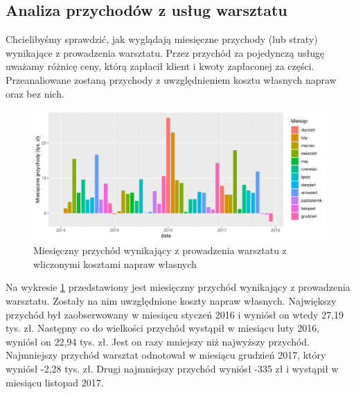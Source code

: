 \documentclass{article}\usepackage[]{graphicx}\usepackage[]{xcolor}
\makeatletter
\def\maxwidth{ %
  \ifdim\Gin@nat@width>\linewidth
    \linewidth
  \else
    \Gin@nat@width
  \fi
}
\newenvironment{knitrout}{}{} %
\makeatother
\begin{document}
\subsection{Analiza przychodów z usług warsztatu}

Chcielibyśmy sprawdzić, jak wyglądają miesięczne przychody (lub straty) wynikające z prowadzenia warsztatu. Przez przychód za pojedynczą usługę uważamy różnicę ceny, którą zapłacił klient i kwoty zapłaconej za części. Przeanaliowane zostaną przychody z uwzględnieniem kosztu własnych napraw oraz bez nich.

\begin{knitrout}
\color{fgcolor}\begin{figure}[H]

{\centering \includegraphics[width=\maxwidth]{figure/fig_uslugi-1} 

}

\caption[Miesięczny przychód wynikający z prowadzenia warsztatu z wliczonymi kosztami napraw własnych]{Miesięczny przychód wynikający z prowadzenia warsztatu z wliczonymi kosztami napraw własnych}\label{fig:fig_uslugi}
\end{figure}

\end{knitrout}

Na wykresie \ref{fig:fig_uslugi} przedstawiony jest miesięczny przychód wynikający z prowadzenia warsztatu. Zostały na nim uwzględnione koszty napraw własnych. 
Największy przychód był zaobserwowany w miesiącu styczeń 2016 i wyniósł on wtedy 27,19 tys. zł.
Następny co do wielkości przychód wystąpił w miesiącu luty 2016, wyniósł on 22,94 tys. zł. Jest on  razy mniejszy niż najwyższy przychód.
Najmniejszy przychód warsztat odnotował w miesiącu grudzień 2017, który wyniósł -2,28 tys. zł. 
Drugi najmniejszy przychód wyniósł -335 zł i wystąpił w miesiącu listopad 2017.
\end{document}
